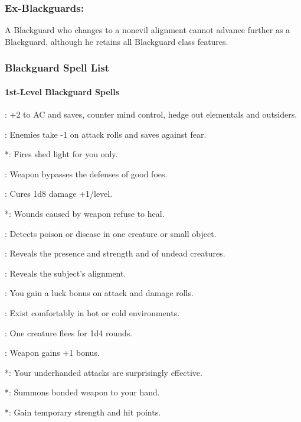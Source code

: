 \subsubsection{Ex-Blackguards:}
A Blackguard who changes to a nonevil alignment cannot advance further as a Blackguard, although he retains all Blackguard class features.

\subsubsection{Blackguard Spell List}
\label{sec:BlackguardSpellList}
\paragraph{1st-Level Blackguard Spells}
\begin{list}{}{\leftmargin=1em}
\item {}: +2 to AC and saves, counter mind control, hedge out elementals and outsiders.
\item {}: Enemies take -1 on attack rolls and saves against fear.%
\item {}*: Fires shed light for you only. %
\item {}: Weapon bypasses the defenses of good foes. %
\item {}: Cures 1d8 damage +1/level.
\item {}*: Wounds caused by weapon refuse to heal. %
\item {}: Detects poison or disease in one creature or small object.
\item {}: Reveals the presence and strength and of undead creatures.
\item {}: Reveals the subject's alignment.
\item {}: You gain a luck bonus on attack and damage rolls.
\item {}: Exist comfortably in hot or cold environments.
\item {}: One creature flees for 1d4 rounds. %
\item {}: Weapon gains +1 bonus.
\item {}*: Your underhanded attacks are surprisingly effective. %
\item {}*: Summons bonded weapon to your hand.
\item {}*: Gain temporary strength and hit points.
\end{list}
